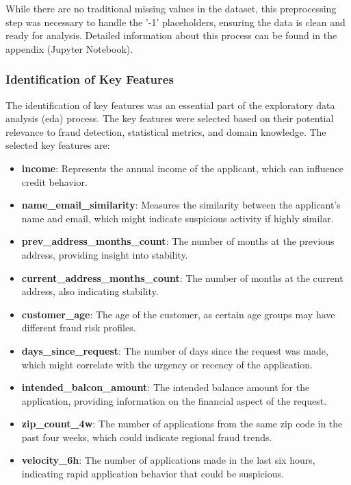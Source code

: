 \documentclass[12pt,a4paper]{report}
\begin{document}
While there are no traditional missing values in the dataset, this preprocessing step was necessary to handle the '-1' placeholders, ensuring the data is clean and ready for analysis. Detailed information about this process can be found in the appendix (Jupyter Notebook).



\subsubsection{Identification of Key Features}
The identification of key features was an essential part of the exploratory data analysis (\acrshort{eda}) process. The key features were selected based on their potential relevance to fraud detection, statistical metrics, and domain knowledge. The selected key features are:

\begin{itemize}
    \item \textbf{income}: Represents the annual income of the applicant, which can influence credit behavior.
    \item \textbf{name\_email\_similarity}: Measures the similarity between the applicant's name and email, which might indicate suspicious activity if highly similar.
    \item \textbf{prev\_address\_months\_count}: The number of months at the previous address, providing insight into stability.
    \item \textbf{current\_address\_months\_count}: The number of months at the current address, also indicating stability.
    \item \textbf{customer\_age}: The age of the customer, as certain age groups may have different fraud risk profiles.
    \item \textbf{days\_since\_request}: The number of days since the request was made, which might correlate with the urgency or recency of the application.
    \item \textbf{intended\_balcon\_amount}: The intended balance amount for the application, providing information on the financial aspect of the request.
    \item \textbf{zip\_count\_4w}: The number of applications from the same zip code in the past four weeks, which could indicate regional fraud trends.
    \item \textbf{velocity\_6h}: The number of applications made in the last six hours, indicating rapid application behavior that could be suspicious.
\end{itemize}
\end{document}
